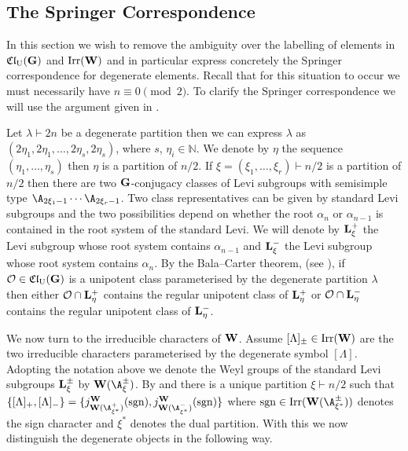 \documentclass[eqthmnum]{jt-calcs}
\newcommand{\Clu}{\ensuremath{\mathfrak{Cl}_{\mathrm{U}}}}
\begin{document}
\subsection{The Springer Correspondence}
\begin{pa}\label{pa:degen-springer-corr}
In this section we wish to remove the ambiguity over the labelling of elements in $\Clu(\bG)$ and $\operatorname{Irr}(\mathbf{W})$ and in particular express concretely the Springer correspondence for degenerate elements. Recall that for this situation to occur we must necessarily have $n \equiv 0 \pmod{2}$. To clarify the Springer correspondence we will use the argument given in \cite[\S13.3]{carter:1993:finite-groups-of-lie-type}.

Let $\lambda \vdash 2n$ be a degenerate partition then we can express $\lambda$ as $(2\eta_1,2\eta_1,\dots,2\eta_s,2\eta_s)$, where $s$, $\eta_i \in \mathbb{N}$. We denote by $\eta$ the sequence $(\eta_1,\dots,\eta_s)$ then $\eta$ is a partition of $n/2$. If $\xi = (\xi_1,\dots,\xi_r) \vdash n/2$ is a partition of $n/2$ then there are two $\mathbf{G}$-conjugacy classes of Levi subgroups with semisimple type $\A_{2\xi_1-1}\cdots\A_{2\xi_r-1}$. Two class representatives can be given by standard Levi subgroups and the two possibilities depend on whether the root $\alpha_n$ or $\alpha_{n-1}$ is contained in the root system of the standard Levi. We will denote by $\mathbf{L}_{\xi}^+$ the Levi subgroup whose root system contains $\alpha_{n-1}$ and $\mathbf{L}_{\xi}^-$ the Levi subgroup whose root system contains $\alpha_n$. By the Bala--Carter theorem, (see \cite[Theorem 5.9.5]{carter:1993:finite-groups-of-lie-type}), if $\mathcal{O} \in \Clu(\bG)$ is a unipotent class parameterised by the degenerate partition $\lambda$ then either $\mathcal{O} \cap \mathbf{L}_{\eta}^+$ contains the regular unipotent class of $\mathbf{L}_{\eta}^+$ or $\mathcal{O} \cap \mathbf{L}_{\eta}^-$ contains the regular unipotent class of $\mathbf{L}_{\eta}^-$.

We now turn to the irreducible characters of $\mathbf{W}$. Assume $[\Lambda]_{\pm} \in \operatorname{Irr}(\mathbf{W})$ are the two irreducible characters parameterised by the degenerate symbol $[\Lambda]$. Adopting the notation above we denote the Weyl groups of the standard Levi subgroups $\mathbf{L}_{\xi}^{\pm}$ by $\bW(\A_{\xi}^{\pm})$. By \cite[Theorem 5.4.5]{geck-pfeiffer:2000:characters-of-finite-coxeter-groups} and \cite[Proposition 5.6.3]{geck-pfeiffer:2000:characters-of-finite-coxeter-groups} there is a unique partition $\xi \vdash n/2$ such that $\{[\Lambda]_+,[\Lambda]_-\} = \{j_{\bW(\A_{\xi^*}^+)}^{\bW}(\sgn),j_{\bW(\A_{\xi^*}^-)}^{\bW}(\sgn)\}$ where $\sgn \in \Irr(\bW(\A_{\xi^*}^{\pm}))$ denotes the sign character and $\xi^*$ denotes the dual partition. With this we now distinguish the degenerate objects in the following way.
\end{pa}
\end{document}
